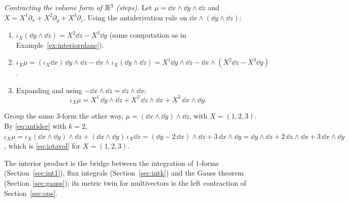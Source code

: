 \emph{Contracting the volume form of $\mathbb{R}^3$ (steps).} Let $\mu=\dd x\wedge\dd y\wedge\dd z$ and $X=X^1\partial_x+X^2\partial_y+X^3\partial_z$. Using the antiderivation rule on $\dd x\wedge(\dd y\wedge\dd z)$:
\begin{enumerate}
\item $\iota_X(\dd y\wedge\dd z)=X^2\dd z-X^3\dd y$ (same computation as in Example~\ref{ex:interiorplane}).
\item $\iota_X\mu=(\iota_X\dd x)\,\dd y\wedge\dd z-\dd x\wedge\iota_X(\dd y\wedge\dd z)=X^1\dd y\wedge\dd z-\dd x\wedge(X^2\dd z-X^3\dd y)$.
\item Expanding and using $-\dd x\wedge\dd z=\dd z\wedge\dd x$:
\begin{equation}\label{eq:iotavol}
\iota_X\mu=X^1\,\dd y\wedge\dd z+X^2\,\dd z\wedge\dd x+X^3\,\dd x\wedge\dd y .
\end{equation}
\end{enumerate}
\numcheck Group the same $3$-form the other way, $\mu=(\dd x\wedge\dd y)\wedge\dd z$, with $X=(1,2,3)$. By \eqref{eq:antider} with $k=2$,
$\iota_X\mu=\iota_X(\dd x\wedge\dd y)\wedge\dd z+(\dd x\wedge\dd y)\,\iota_X\dd z=(\dd y-2\,\dd x)\wedge\dd z+3\,\dd x\wedge\dd y
=\dd y\wedge\dd z+2\,\dd z\wedge\dd x+3\,\dd x\wedge\dd y$, which is \eqref{eq:iotavol} for $X=(1,2,3)$. \checkmark

The interior product is the bridge between the integration of $1$-forms (Section~\ref{sec:int1}), flux integrals (Section~\ref{sec:intk}) and the Gauss theorem (Section~\ref{sec:gauss}); its metric twin for multivectors is the left contraction of Section~\ref{sec:ops}.
